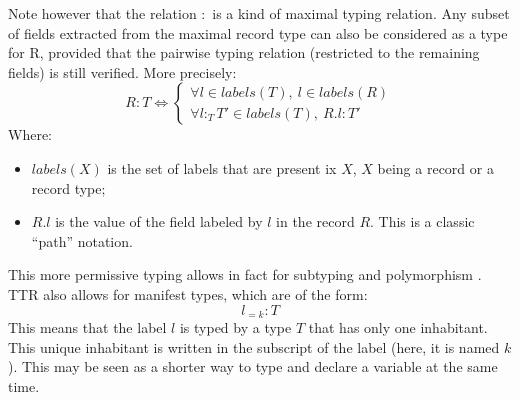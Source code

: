 \documentclass[11pt]{article}
\begin{document}
				Note however that the relation $:$ is a kind of maximal typing relation. Any subset of fields extracted from the maximal record type can also be considered as a type for R, provided that the pairwise typing relation (restricted to the remaining fields) is still verified. More precisely:
				\begin{equation*}
					R : T \iff \left\lbrace\begin{array}{l}
					\forall l \in labels(T), \ l \in labels(R) \\
					\forall l :_T T' \in labels(T), \ R.l : T'
					\end{array}\right.
				\end{equation*}
				Where:
				\begin{itemize}
					\item $labels(X)$ is the set of labels that are present ix $X$, $X$ being a record or a record type;\vspace{-2mm}
					\item $R.l$ is the value of the field labeled by $l$ in the record $R$. This is a classic ``path'' notation.
				\end{itemize}
				This more permissive typing allows in fact for subtyping and polymorphism \cite{cooper2005}.\\
				
				TTR also allows for manifest types, which are of the form:
				\begin{equation*}
					l_{=k} : T
				\end{equation*}
				This means that the label $l$ is typed by a type $T$ that has only one inhabitant. This unique inhabitant is written in the subscript of the label (here, it is named $k$). This may be seen as a shorter way to type and declare a variable at the same time.
\end{document}
